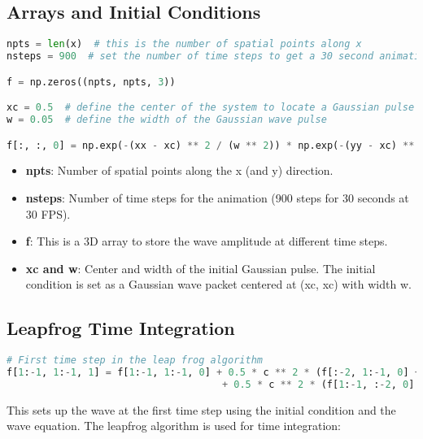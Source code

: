 \documentclass{article}
\begin{document}
\subsection{Arrays and Initial Conditions}

\begin{lstlisting}[language=Python]
npts = len(x)  # this is the number of spatial points along x
nsteps = 900  # set the number of time steps to get a 30 second animation at 30 FPS

f = np.zeros((npts, npts, 3))

xc = 0.5  # define the center of the system to locate a Gaussian pulse
w = 0.05  # define the width of the Gaussian wave pulse

f[:, :, 0] = np.exp(-(xx - xc) ** 2 / (w ** 2)) * np.exp(-(yy - xc) ** 2 / (w ** 2))  # initial condition for a Gaussian
\end{lstlisting}

\begin{itemize}
    \item \textbf{npts}: Number of spatial points along the x (and y) direction.
    \item \textbf{nsteps}: Number of time steps for the animation (900 steps for 30 seconds at 30 FPS).
    \item \textbf{f}: This is a 3D array to store the wave amplitude at different time steps.
    \item \textbf{xc and w}: Center and width of the initial Gaussian pulse. The initial condition is set as a Gaussian wave packet centered at (xc, xc) with width w.
\end{itemize}

\subsection{Leapfrog Time Integration}

\begin{lstlisting}[language=Python]
# First time step in the leap frog algorithm
f[1:-1, 1:-1, 1] = f[1:-1, 1:-1, 0] + 0.5 * c ** 2 * (f[:-2, 1:-1, 0] + f[2:, 1:-1, 0] - 2. * f[1:-1, 1:-1, 0]) * (dt ** 2 / dx ** 2) \
                                     + 0.5 * c ** 2 * (f[1:-1, :-2, 0] + f[1:-1, 2:, 0] - 2. * f[1:-1, 1:-1, 0]) * (dt ** 2 / dx ** 2)
\end{lstlisting}

This sets up the wave at the first time step using the initial condition and the wave equation. The leapfrog algorithm is used for time integration:
\end{document}
